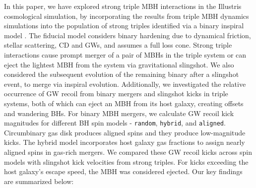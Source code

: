 \documentclass[twocolumn,linenumbers]{aastex701}
\begin{document}
In this paper, we have explored strong triple MBH interactions in the Illustris cosmological simulation, by incorporating the results from triple MBH dynamics simulations \citep{bonetti_post-newtonian_2018-1} into the population of strong triples identified via a binary inspiral model \citep{Kelley_2017a, sayeb_mbh_2023}. The fiducial model considers binary hardening due to dynamical friction, stellar scattering, CD and GWs, and assumes a full loss cone. Strong triple interactions cause prompt merger of a pair of MBHs in the triple system or can eject the lightest MBH from the system via gravitational slingshot. We also considered the subsequent evolution of the remaining binary after a slingshot event, to merge via inspiral evolution. Additionally, we investigated the relative occurrence of GW recoil from binary mergers and slingshot kicks in triple systems, both of which can eject an MBH from its host galaxy, creating offsets and wandering BHs. For binary MBH mergers, we calculate GW recoil kick magnitudes for different BH spin models - \texttt{random}, \texttt{hybrid}, and \texttt{aligned}. Circumbinary gas disk produces aligned spins and they produce low-magnitude kicks. The hybrid model incorporates host galaxy gas fractions to assign nearly aligned spins in gas-rich mergers. We compared these GW recoil kicks across spin models with slingshot kick velocities from strong triples. For kicks exceeding the host galaxy's escape speed, the MBH was considered ejected. Our key findings are summarized below:
\end{document}
